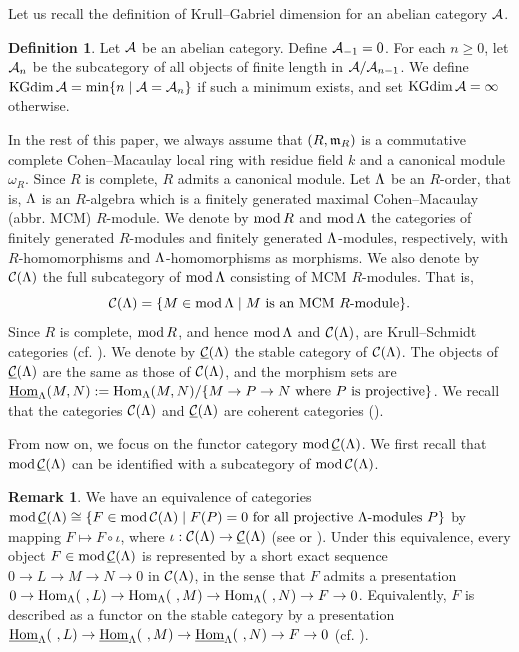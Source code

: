 \documentclass[11pt]{amsart}
\theoremstyle{definition}
\newtheorem{definition}[theorem]{Definition}
\newtheorem{remark}[theorem]{Remark}
\numberwithin{equation}{section}
\begin{document}
Let us recall the definition of Krull--Gabriel dimension for an abelian category $\AA$. 

\begin{definition}\cite[Definition 2.1]{G85}\label{B1}
Let $\AA$ be an abelian category. 
Define $\AA_{-1} = 0$. 
For each $n \geq 0$, let $\AA _{n}$ be the subcategory of all objects of finite length in $\AA/\AA_{n-1}$. 
We define $\KGdim \AA = \min \{ n \mid \AA = \AA _n \}$ if such a minimum exists, and set $\KGdim \AA = \infty $ otherwise.  
\end{definition}

In the rest of this paper, we always assume that $(R, \m_R)$ is a commutative complete Cohen--Macaulay local ring with residue field $k$ and a canonical module $\omega _R$. 
Since $R$ is complete, $R$ admits a canonical module.  
Let $\LL$ be an $R$-order, that is, $\LL$ is an $R$-algebra which is a finitely generated maximal Cohen--Macaulay (abbr. MCM) $R$-module. 
We denote by $\modR$ and $\modL$ the categories of finitely generated $R$-modules and finitely generated $\LL$-modules, respectively, with $R$-homomorphisms and $\LL$-homomorphisms as morphisms.
We also denote by $\CML$ the full subcategory of $\modL$ consisting of MCM $R$-modules. 
That is, 
$$
\CML =  \{ M \in \modL \mid \text{$M$ is an MCM $R$-module} \} .
$$
Since $R$ is complete, $\modR$, and hence $\modL$ and $\CML$, are  Krull--Schmidt categories (cf. \cite[(1.18)]{Y}). 
We denote by $\sCML$ the stable category of $\CML$.  
The objects of $\sCML$ are the same as those of $\CML$, and the morphism sets are $\sHomL(M, N):=\HomL(M, N)/ \{ M \to P \to N \text{ where $P$ is projective} \}$. 
We recall that the categories $\CML$ and $\sCML$ are coherent categories (\cite[$\S$ 4]{Y}). 


From now on, we focus on the functor category $\modsCML$. 
We first recall that $\modsCML$ can be identified with a subcategory of $\modCML$.

\begin{remark}\label{B2}
We have an equivalence of categories $\modsCML \cong  \{ F \in \modCML \mid F(P)=0 \text{ for all projective $\LL$-modules $P$} \} $ by mapping $F \mapsto F \circ \iota $, where $\iota : \CML \to \sCML$ (see \cite[Remark 2.6]{Y05} or \cite[Lemma 2.5]{E19}). 
Under this equivalence, every object $F\in \modsCML$ is represented by a short exact sequence $0\to L\to M\to N\to 0$ in $\CML$, in the sense that $F$ admits a presentation $0\to \HomL (\ ,L)\to \HomL (\ ,M)\to \HomL (\ ,N)\to F\to 0$. 
Equivalently, $F$ is described as a functor on the stable category by a presentation $\sHomL (\ , L) \to \sHomL (\ , M) \to \sHomL (\ , N) \to F \to 0$ (cf. \cite[Remark 4.16]{Y}).  
\end{remark}
\end{document}
